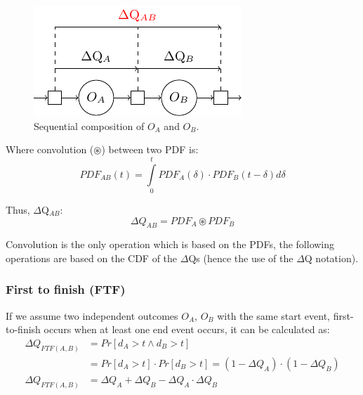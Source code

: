         \begin{figure}[H]
            \begin{center}
                \includegraphics[scale=1]{tikz/seq_comp.pdf}
            \end{center}
            \caption{Sequential composition of $O_A$ and $O_B$.}
        \end{figure}
        Where convolution ($\circledast$) between two PDF is:
        \begin{equation}
            PDF_{AB}(t) =\int\limits_0^t PDF_A(\delta) \cdot PDF_B(t-\delta)d\delta 
            \label{eq:conv_1}
        \end{equation}

        Thus, $\Delta$Q$_{AB}$:
        \begin{equation}
            \Delta Q_{AB} = PDF_{A} \circledast PDF_{B}
            \label{eq:convolution_pdf}
        \end{equation}

        Convolution is the only operation which is based on the PDFs, the following operations are based on the CDF of the $\Delta$Qs (hence the use of the $\Delta$Q notation).
        
    \subsubsection{First to finish (FTF)}
            If we assume two independent outcomes $O_A$, $O_B$ with the same start event, first-to-finish occurs when at least one end event occurs, it can be calculated as:
        \begin{equation}
            \begin{split}
                \Delta Q_{FTF(A, B)} &= Pr[d_A > t \wedge d_B > t] \\
                & = Pr[d_A > t] \cdot Pr[d_B > t] = (1 - \Delta Q_A) \cdot (1 - \Delta Q_B) \\
                \Delta Q_{FTF(A, B)} &= \Delta Q_A + \Delta Q_B - \Delta Q_A \cdot \Delta Q_B  
            \end{split}    
            \label{eq:ftf} 
        \end{equation}

